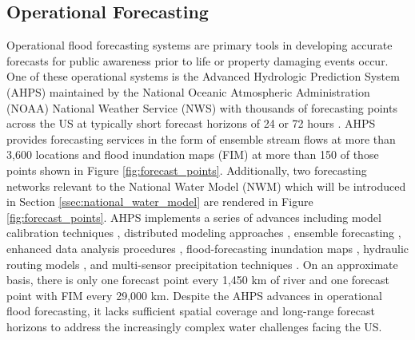 \subsection{Operational Forecasting}
%
Operational flood forecasting systems are primary tools in developing accurate forecasts for public awareness prior to life or property damaging events occur. 
One of these operational systems is the Advanced Hydrologic Prediction System (AHPS) maintained by the National Oceanic Atmospheric Administration (NOAA) National Weather Service (NWS) with thousands of forecasting points across the US at typically short forecast horizons of 24 or 72 hours \cite{mcenery2005noaa}.
AHPS provides forecasting services in the form of ensemble stream flows at more than 3,600 locations and flood inundation maps (FIM) at more than 150 of those points shown in Figure \ref{fig:forecast_points}.
Additionally, two forecasting networks relevant to the National Water Model (NWM) which will be introduced in Section \ref{ssec:national_water_model} are rendered in Figure \ref{fig:forecast_points}.
AHPS implements a series of advances including model calibration techniques \cite{zhang2003hydrologic,hogue2003multi,duan2003global,gupta2003advances,parada2003multi}, distributed modeling approaches \cite{reed2004overall,koren2004hydrology,duan2002results}, ensemble forecasting \cite{day1985extended,seo2000simulation,mullusky2002simplified,herr2002simplified}, enhanced data analysis procedures \cite{mcenery2005noaa}, flood-forecasting inundation maps \cite{cajina2002fldview}, hydraulic routing models \cite{fread1973technique,cajina2002fldview}, and multi-sensor precipitation techniques \cite{breidenbach1999accounting,kondragunta2001outlier,seo2002real,bonnin1996noaa}.
On an approximate basis, there is only one forecast point every 1,450 km of river and one forecast point with FIM every 29,000 km.
Despite the AHPS advances in operational flood forecasting, it lacks sufficient spatial coverage and long-range forecast horizons to address the increasingly complex water challenges facing the US.
%

